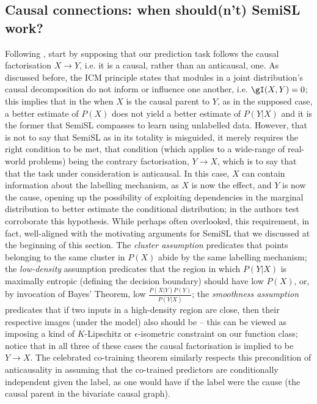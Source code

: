 \subsection{
  Causal connections: when should(n't) SemiSL work?
}\label{ssec:semisl-causality}

Following \cite{scholkopf2021toward}, start by supposing that our prediction task follows the
causal factorisation \( X \to Y\), i.e. it is a causal, rather than an anticausal, one.
%
As discussed before, the ICM principle states that modules in a joint distribution's causal
decomposition do not inform or influence one another, i.e. \(\gI(X, Y) = 0 \); this implies that in
the when \(X\) is the causal parent to \(Y\), as in the supposed case, a better estimate of
\(P(X)\) does not yield a better estimate of \(P(Y|X)\) and it is the former that SemiSL
compasses to learn using unlabelled data.
%
However, that is not to say that SemiSL as in its totality is misguided, it merely requires the
right condition to be met, that condition (which applies to a wide-range of real-world problems)
being the contrary factorisation, \(Y \to X \), which is to say that that the task under
consideration is anticausal.
%
In this case, \(X\) can contain information about the labelling mechanism, as \(X\) is now the
effect, and \(Y\) is now the cause, opening up the possibility of exploiting dependencies in the
marginal distribution to better estimate the conditional distribution; in
\cite{scholkopf2012causal} the authors test corroborate this hypothesis.
%
While perhaps often overlooked, this requirement, in fact, well-aligned with the motivating
arguments for SemiSL that we discussed at the beginning of this section.
%
The \emph{cluster assumption} predicates that points belonging to the same cluster in \(P(X)\)
abide by the same labelling mechanism; 
%
the \emph{low-density} assumption predicates that the region in which \(P(Y|X)\) is maximally
entropic (defining the decision boundary) should have low \(P(X)\), or, by invocation of Bayes'
Theorem, low \( \frac{ P(X|Y)P(Y) }{ P(Y|X) } \); 
%
the \emph{smoothness assumption} predicates that if two inputs in a high-density region are close,
then their respective images (under the model) also should be -- this can be viewed as imposing a
kind of \(K\)-Lipschitz or \(\epsilon\)-isometric constraint on our function class;
%
notice that in all three of these cases the causal factorisation is implied to be \(Y \to X \).
%
The celebrated co-training theorem \citep{blum1998combining} similarly respects this precondition
of anticausality in assuming that the co-trained predictors are conditionally independent given the
label, as one would have if the label were the cause (the causal parent in the bivariate causal graph).
%

